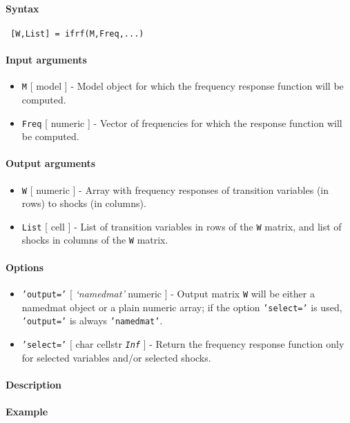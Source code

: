 


	\paragraph{Syntax}
 
 \begin{verbatim}
 [W,List] = ifrf(M,Freq,...)
 \end{verbatim}
 
 \paragraph{Input arguments}
 
 \begin{itemize}
 \item
   \texttt{M} {[} model {]} - Model object for which the frequency
   response function will be computed.
 \item
   \texttt{Freq} {[} numeric {]} - Vector of frequencies for which the
   response function will be computed.
 \end{itemize}
 
 \paragraph{Output arguments}
 
 \begin{itemize}
 \item
   \texttt{W} {[} numeric {]} - Array with frequency responses of
   transition variables (in rows) to shocks (in columns).
 \item
   \texttt{List} {[} cell {]} - List of transition variables in rows of
   the \texttt{W} matrix, and list of shocks in columns of the \texttt{W}
   matrix.
 \end{itemize}
 
 \paragraph{Options}
 
 \begin{itemize}
 \item
   \texttt{'output='} {[} \emph{`namedmat'} \textbar{} numeric {]} -
   Output matrix \texttt{W} will be either a namedmat object or a plain
   numeric array; if the option \texttt{'select='} is used,
   \texttt{'output='} is always \texttt{'namedmat'}.
 \item
   \texttt{'select='} {[} char \textbar{} cellstr \textbar{}
   \emph{\texttt{Inf}} {]} - Return the frequency response function only
   for selected variables and/or selected shocks.
 \end{itemize}
 
 \paragraph{Description}
 
 \paragraph{Example}


